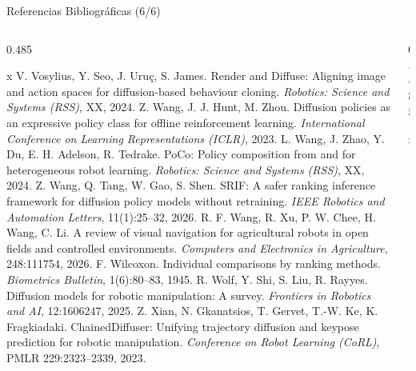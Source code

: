 \documentclass[aspectratio=169,10pt,xcolor={dvipsnames,table}]{beamer}
\begin{document}
\begin{frame}{Referencias Bibliográficas (6/6)}
  \begin{columns}[T, onlytextwidth]
    \begin{column}{0.485\textwidth}
      \RefsFont
      \begin{thebibliography}{x}\setlength{\itemsep}{0.8pt}
         V. Vosylius, Y. Seo, J. Uruç, S. James. \newblock Render and Diffuse: Aligning image and action spaces for diffusion-based behaviour cloning. \newblock \emph{Robotics: Science and Systems (RSS)}, XX, 2024.
         Z. Wang, J. J. Hunt, M. Zhou. \newblock Diffusion policies as an expressive policy class for offline reinforcement learning. \newblock \emph{International Conference on Learning Representations (ICLR)}, 2023.
         L. Wang, J. Zhao, Y. Du, E. H. Adelson, R. Tedrake. \newblock PoCo: Policy composition from and for heterogeneous robot learning. \newblock \emph{Robotics: Science and Systems (RSS)}, XX, 2024.
         Z. Wang, Q. Tang, W. Gao, S. Shen. \newblock SRIF: A safer ranking inference framework for diffusion policy models without retraining. \newblock \emph{IEEE Robotics and Automation Letters}, 11(1):25--32, 2026.
         R. F. Wang, R. Xu, P. W. Chee, H. Wang, C. Li. \newblock A review of visual navigation for agricultural robots in open fields and controlled environments. \newblock \emph{Computers and Electronics in Agriculture}, 248:111754, 2026.
         F. Wilcoxon. \newblock Individual comparisons by ranking methods. \newblock \emph{Biometrics Bulletin}, 1(6):80--83, 1945.
         R. Wolf, Y. Shi, S. Liu, R. Rayyes. \newblock Diffusion models for robotic manipulation: A survey. \newblock \emph{Frontiers in Robotics and AI}, 12:1606247, 2025.
         Z. Xian, N. Gkanatsios, T. Gervet, T.-W. Ke, K. Fragkiadaki. \newblock ChainedDiffuser: Unifying trajectory diffusion and keypose prediction for robotic manipulation. \newblock \emph{Conference on Robot Learning (CoRL)}, PMLR 229:2323--2339, 2023.
      \end{thebibliography}
    \end{column}
    \begin{column}{0.485\textwidth}
      \RefsFont
      \begin{thebibliography}{x}\setlength{\itemsep}{0.8pt}

\end{thebibliography}
\end{column}
\end{columns}
\end{frame}
\end{document}
